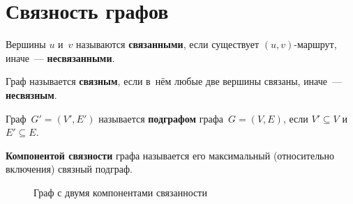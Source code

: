 \section{Связность графов}

Вершины $u$ и~$v$ называются \textbf{связанными}, если существует $(u, v)$-маршрут, иначе~---
\textbf{несвязанными}.

Граф называется \textbf{связным}, если в~нём любые две вершины связаны, иначе~--- \textbf{несвязным}.

Граф~$G' = (V', E')$ называется \textbf{подграфом} графа~$G = (V, E)$, если $V' \subseteq V$ и
~$E' \subseteq E$.

\textbf{Компонентой связности} графа называется его максимальный (относительно включения)
связный подграф.

\begin{figure}[h!]
	\begin{center}
	\end{center}
	\caption{Граф с двумя компонентами связанности}
\end{figure}

 


